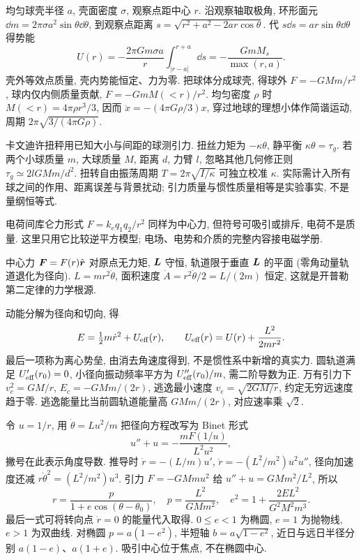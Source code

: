 \label{ch:gravity}
均匀球壳半径 $a$, 壳面密度 $\sigma$, 观察点距中心 $r$. 沿观察轴取极角, 环形面元 $\dd m=2\pi\sigma a^2\sin\theta\dd\theta$, 到观察点距离 $s=\sqrt{r^2+a^2-2ar\cos\theta}$. 代 $s\dd s=ar\sin\theta\dd\theta$ 得势能
\begin{equation}
U(r)=-\frac{2\pi Gm\sigma a}{r}\int_{|r-a|}^{r+a}\dd s
=-\frac{GmM_s}{\max(r,a)}.
\end{equation}
壳外等效点质量, 壳内势能恒定、力为零. 把球体分成球壳, 得球外 $F=-GMm/r^2$, 球内仅内侧质量贡献, $F=-GmM(<r)/r^2$. 均匀密度 $\rho$ 时 $M(<r)=4\pi\rho r^3/3$, 因而 $\ddot x=-(4\pi G\rho/3)x$, 穿过地球的理想小体作简谐运动, 周期 $2\pi\sqrt{3/(4\pi G\rho)}$.

卡文迪许扭秤用已知大小与间距的球测引力. 扭丝力矩为 $-\kappa\theta$, 静平衡 $\kappa\theta=\tau_g$. 若两个小球质量 $m$, 大球质量 $M$, 距离 $d$, 力臂 $l$, 忽略其他几何修正则 $\tau_g\simeq2lGMm/d^2$. 扭转自由振荡周期 $T=2\pi\sqrt{I/\kappa}$ 可独立校准 $\kappa$. 实际需计入所有球之间的作用、距离误差与背景扰动; 引力质量与惯性质量相等是实验事实, 不是量纲恒等式.

电荷间库仑力形式 $F=k_e q_1q_2/r^2$ 同样为中心力, 但符号可吸引或排斥, 电荷不是质量. 这里只用它比较逆平方模型; 电场、电势和介质的完整内容接电磁学册.

中心力 $\boldsymbol{F}=F(r)\hat{\boldsymbol{r}}$ 对原点无力矩, $\boldsymbol{L}$ 守恒, 轨道限于垂直 $\boldsymbol{L}$ 的平面 (零角动量轨道退化为径向). $L=mr^2\dot\theta$, 面积速度 $\dot A=r^2\dot\theta/2=L/(2m)$ 恒定, 这就是开普勒第二定律的力学根源.

动能分解为径向和切向, 得
\begin{equation}
E=\tfrac12m\dot r^2+U_{\rm eff}(r),\qquad
U_{\rm eff}(r)=U(r)+\frac{L^2}{2mr^2}.
\end{equation}
最后一项称为离心势垒, 由消去角速度得到, 不是惯性系中新增的真实力. 圆轨道满足 $U'_{\rm eff}(r_0)=0$, 小径向振动频率平方为 $U''_{\rm eff}(r_0)/m$, 需二阶导数为正. 万有引力下 $v_c^2=GM/r$, $E_c=-GMm/(2r)$, 逃逸最小速度 $v_e=\sqrt{2GM/r}$, 约定无穷远速度趋于零. 逃逸能量比当前圆轨道能量高 $GMm/(2r)$, 对应速率乘 $\sqrt2$.

令 $u=1/r$, 用 $\dot\theta=Lu^2/m$ 把径向方程改写为 Binet 形式
\begin{equation}
u''+u=-\frac{mF(1/u)}{L^2u^2},
\end{equation}
撇号在此表示角度导数. 推导时 $\dot r=-(L/m)u'$, $\ddot r=-(L^2/m^2)u^2u''$, 径向加速度还减 $r\dot\theta^2=(L^2/m^2)u^3$. 引力 $F=-GMmu^2$ 给 $u''+u=GMm^2/L^2$, 所以
\begin{equation}
r=\frac{p}{1+e\cos(\theta-\theta_0)},\quad
p=\frac{L^2}{GMm^2},\quad
 e^2=1+\frac{2EL^2}{G^2M^2m^3}.
\end{equation}
最后一式可将转向点 $\dot r=0$ 的能量代入取得. $0\le e<1$ 为椭圆, $e=1$ 为抛物线, $e>1$ 为双曲线. 对椭圆 $p=a(1-e^2)$, 半短轴 $b=a\sqrt{1-e^2}$, 近日与远日半径分别 $a(1-e)$、$a(1+e)$. 吸引中心位于焦点, 不在椭圆中心.

